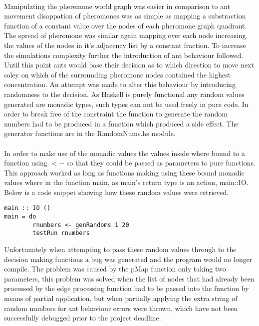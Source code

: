 \documentclass[main.tex]{subfiles}
\begin{document}
\paragraph{}Manipulating the pheremone world graph was easier in comparison to ant movement disappation of pheromones was as simple as mapping a substraction function of a constant value over the nodes of each pheromone graph quadrant. The spread of pheromone was similar again mapping over each node increasing the values of the nodes in it's adjacency list by a constant fraction. To increase the simulations complexity further the introduction of ant behaviour followed. Until this point ants would base their decision as to which direction to move next soley on which of the surrounding pheromone nodes contained the highest concentration. An attempt was made to alter this behaviour by introducing randomness to the decision. As Haskell is purely functional any random values generated are monadic types, such types can not be used freely in pure code. In order to break free of the constraint the function to generate the random numbers had to be produced in a function which produced a side effect. The generator functions are in the RandomNums.hs module.

\paragraph{} In order to make use of the monadic values the values inside where bound to a function using $<-$ so that they could be passed as parameters to pure functions. This approach worked as long as functions making using these bound monadic values where in the function main, as main's return type is an action, main::IO. Below is a code snippet showing how these random values were retrieved.

\begin{lstlisting}
main :: IO ()
main = do
        rnumbers <- genRandoms 1 20
        testRun rnumbers
\end{lstlisting}

Unfortunately when attempting to pass these random values through to the decision making functions a bug was generated and the program would no longer compile. The problem was caused by the pMap function only taking two parameters, this problem was solved when the list of nodes that had already been processed by the edge processing function had to be passed into the function by means of partial application, but when partially applying the extra string of random numbers for ant behaviour errors were thrown, which have not been successfully debugged prior to the project deadline.
\end{document}
